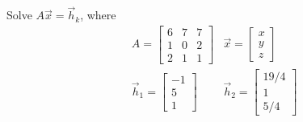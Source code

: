 \begin{Exercise}
Solve $A\vec{x} = \vec{h}_k$, where
\begin{align*}
&A =
\begin{bmatrix}
6 & 7 & 7\\
1 & 0 & 2\\
2 & 1 & 1
\end{bmatrix}
&\vec{x} =
\begin{bmatrix}
x\\
y\\
z
\end{bmatrix} \\
& \vec{h}_1 =
\begin{bmatrix}
-1 \\
5 \\
1
\end{bmatrix}
& \vec{h}_2 =
\begin{bmatrix}
19/4 \\
1 \\
5/4
\end{bmatrix}
\end{align*}
\end{Exercise}
